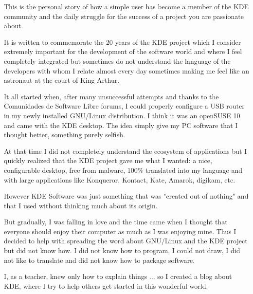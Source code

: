 

\noindent{}This is the personal story of how a simple user has become a member of the KDE community and the daily struggle for the success of a project you are passionate about.

It is written to commemorate the 20 years of the KDE project which I consider extremely important for the development of the software world and where I feel completely integrated but sometimes do not understand the language of the developers with whom I relate almost every day sometimes making me feel like an astronaut at the court of King Arthur.

It all started when, after many unsuccessful attempts and thanks to the Comunidades de Software Libre forums, I could properly configure a USB router in my newly installed GNU/Linux distribution. I think it was an openSUSE 10 and came with the KDE desktop. The idea simply give my PC software that I thought better, something purely selfish.

At that time I did not completely understand the ecosystem of applications but I quickly realized that the KDE project gave me what I wanted: a nice, configurable desktop, free from malware, 100\% translated into my language and with large applications like Konqueror, Kontact, Kate, Amarok, digikam, etc.

However KDE Software was just something that was "created out of nothing" and that I used without thinking much about its origin.

But gradually, I was falling in love and the time came when I thought that everyone should enjoy their computer as much as I was enjoying mine.
Thus I decided to help with spreading the word about GNU/Linux and the KDE project but did not know how. I did not know how to program, I could not draw, I did not like to translate and did not know how to package software.

I, as a teacher, knew only how to explain things ... so I created a blog about KDE, where I try to help others get started in this wonderful world.

